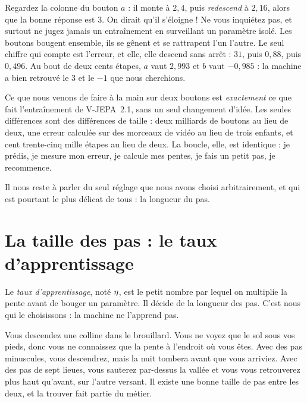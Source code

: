 \begin{piege}
Regardez la colonne du bouton $a$ : il monte à $2{,}4$, puis \emph{redescend}
à $2{,}16$, alors que la bonne réponse est $3$. On dirait qu'il s'éloigne !
Ne vous inquiétez pas, et surtout ne jugez jamais un entraînement en
surveillant un paramètre isolé. Les boutons bougent ensemble, ils se
gênent et se rattrapent l'un l'autre. Le seul chiffre qui compte est
l'erreur, et elle, elle descend sans arrêt : $31$, puis $0{,}88$, puis
$0{,}496$. Au bout de deux cents étapes, $a$ vaut $2{,}993$ et $b$ vaut
$-0{,}985$ : la machine a bien retrouvé le $3$ et le $-1$ que nous
cherchions.
\end{piege}

\begin{enia}
Ce que nous venons de faire à la main sur deux boutons est \emph{exactement}
ce que fait l'entraînement de V-JEPA~2.1, sans un seul changement d'idée.
Les seules différences sont des différences de taille : deux milliards de
boutons au lieu de deux, une erreur calculée sur des morceaux de vidéo au
lieu de trois enfants, et cent trente-cinq mille étapes au lieu de deux.
La boucle, elle, est identique : je prédis, je mesure mon erreur, je calcule
mes pentes, je fais un petit pas, je recommence.
\end{enia}

Il nous reste à parler du seul réglage que nous avons choisi arbitrairement,
et qui est pourtant le plus délicat de tous : la longueur du pas.

\section{La taille des pas : le taux d'apprentissage}

\begin{definition}
Le \emph{taux d'apprentissage}, noté $\eta$, est le petit nombre par lequel
on multiplie la pente avant de bouger un paramètre. Il décide de la longueur
des pas. C'est nous qui le choisissons : la machine ne l'apprend pas.
\end{definition}

\begin{intuition}
Vous descendez une colline dans le brouillard. Vous ne voyez que le sol sous
vos pieds, donc vous ne connaissez que la pente à l'endroit où vous êtes.
Avec des pas minuscules, vous descendrez, mais la nuit tombera avant que
vous arriviez. Avec des pas de sept lieues, vous sauterez par-dessus la
vallée et vous vous retrouverez plus haut qu'avant, sur l'autre versant. Il
existe une bonne taille de pas entre les deux, et la trouver fait partie du
métier.
\end{intuition}

